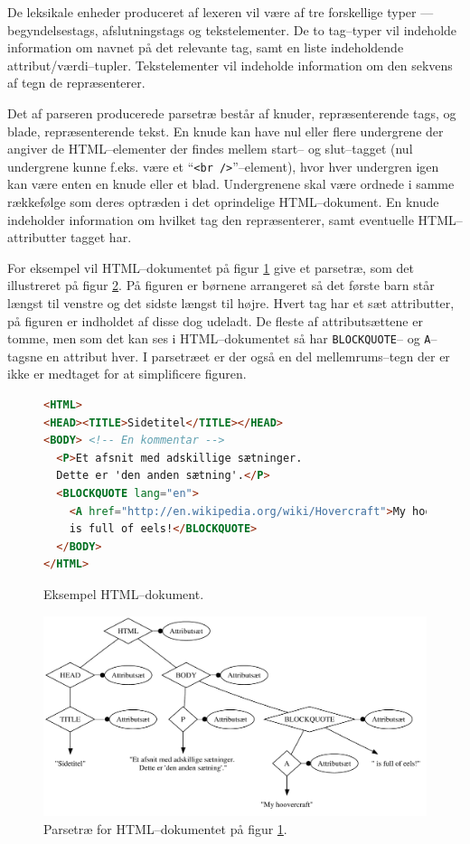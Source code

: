 \documentclass[a4paper,oneside,article]{memoir}
\begin{document}
De leksikale enheder produceret af lexeren vil være af tre forskellige
typer --- begyndelsestags, afslutningstags og tekstelementer. De to
tag--typer vil indeholde information om navnet på det relevante tag,
samt en liste indeholdende attribut/værdi--tupler. Tekstelementer vil
indeholde information om den sekvens af tegn de repræsenterer.

Det af parseren producerede parsetræ består af knuder, repræsenterende
tags, og blade, repræsenterende tekst. En knude kan have nul eller
flere undergrene der angiver de HTML--elementer der findes mellem
start-- og slut--tagget (nul undergrene kunne f.eks. være et
``\texttt{<br />}''--element), hvor hver undergren igen kan være enten
en knude eller et blad. Undergrenene skal være ordnede i samme
rækkefølge som deres optræden i det oprindelige HTML--dokument. En
knude indeholder information om hvilket tag den repræsenterer, samt
eventuelle HTML--attributter tagget har.

For eksempel vil HTML--dokumentet på figur \ref{htmldoc1} give et
parsetræ, som det illustreret på figur \ref{parsetree}. På figuren er
børnene arrangeret så det første barn står længst til venstre og det
sidste længst til højre. Hvert tag har et sæt attributter, på figuren
er indholdet af disse dog udeladt. De fleste af attributsættene er
tomme, men som det kan ses i HTML--dokumentet så har
\texttt{BLOCKQUOTE}-- og \texttt{A}--tagsne en attribut hver.
I parsetræet er der også en del mellemrums--tegn der er ikke er
medtaget for at simplificere figuren.

\begin{figure}
\begin{lstlisting}[language=HTML]
<HTML>
<HEAD><TITLE>Sidetitel</TITLE></HEAD>
<BODY> <!-- En kommentar -->
  <P>Et afsnit med adskillige sætninger.
  Dette er 'den anden sætning'.</P>
  <BLOCKQUOTE lang="en">
    <A href="http://en.wikipedia.org/wiki/Hovercraft">My hoovercraft</A>
    is full of eels!</BLOCKQUOTE>
  </BODY>
</HTML>
\end{lstlisting}

  \caption{Eksempel HTML--dokument.}
  \label{htmldoc1}
\end{figure}

\begin{figure}
  \includegraphics[width=\textwidth]{parsetree.pdf}
  \caption{Parsetræ for HTML--dokumentet på figur \ref{htmldoc1}.}
  \label{parsetree}
\end{figure}
\end{document}
